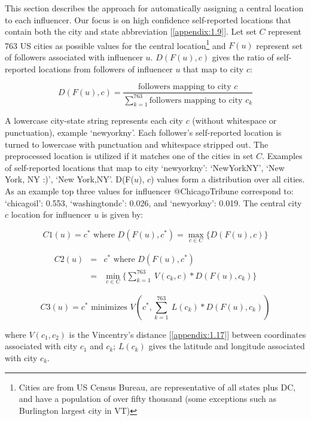 This section describes the approach for automatically assigning a central location to each influencer. Our focus is on high confidence self-reported locations that contain both the city and state abbreviation [\ref{appendix:1.9}]. Let set $C$ represent 763 US cities as possible values for the central location\footnote{Cities are from US Census Bureau, are representative of all states plus DC, and have a population of over fifty thousand (some exceptions such as Burlington largest city in VT)} and $F(u)$ represent set of followers associated with influencer $u$. $D(F(u), c)$ gives the ratio of self-reported locations from followers of influencer $u$ that map to city $c$:

\begin{equation}
\label{eqn_DFu}
D(F(u), c) = \frac{
\text{followers  mapping  to  city  }c}{\sum_{k=1}^{763}\text{followers mapping to city } c_k}
\end{equation}

A lowercase city-state string represents each city $c$ (without whitespace or punctuation), example `newyorkny'. Each follower's self-reported location is turned to lowercase with punctuation and whitespace stripped out. The preprocessed location is utilized if it matches one of the cities in set $C$. Examples of self-reported locations that map to city `newyorkny': `NewYorkNY', `New York, NY :)', `New York,NY'. D(F($u$), $c$) values form a distribution over all cities. As an example top three values for influencer @ChicagoTribune correspond to: `chicagoil': 0.553, `washingtondc': 0.026, and `newyorkny': 0.019. The central city $c$ location for influencer $u$ is given by:

\begin{equation}
C1(u) = c^* \text{ where } D(F(u), c^*) = \max_{c \in C}\{D(F(u), c)\}
\end{equation}

\begin{eqnarray}
C2(u) & = & c^* \text{ where } D(F(u), c^*) \\ \nonumber
& = & \min_{c \in C}\{\sum_{k=1}^{763} \ V(c_k, c)*D(F(u), c_k)\}
\end{eqnarray}

\begin{equation}
C3(u) = c^* \text{ minimizes } V(c^*, {\sum_{k=1}^{763} \ L(c_k) * D(F(u), c_k)})
\end{equation}

\noindent where $V(c_1, c_2)$ is the Vincentry's distance [\ref{appendix:1.17}] between coordinates associated with city $c_1$ and $c_k$; $L(c_k)$ gives the latitude and longitude associated with city $c_k$.


